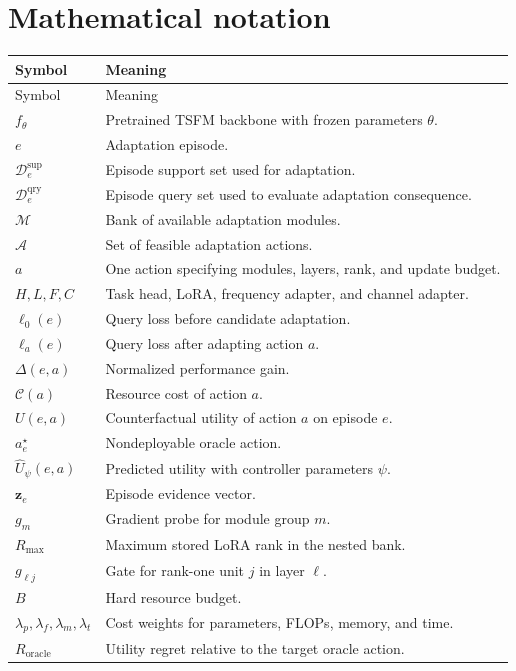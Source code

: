 \documentclass[10pt]{article}
\newcommand{\z}{\mathbf{z}}
\newcommand{\D}{\mathcal{D}}
\newcommand{\Mcal}{\mathcal{M}}
\newcommand{\Acal}{\mathcal{A}}
\newcommand{\Ccal}{\mathcal{C}}
\begin{document}
\section{Mathematical notation}

\begin{longtable}{L{0.16\textwidth}L{0.76\textwidth}}
\toprule
Symbol & Meaning \\
\midrule
\endfirsthead
\toprule
Symbol & Meaning \\
\midrule
\endhead
$f_{\theta}$ & Pretrained TSFM backbone with frozen parameters $\theta$. \\
$e$ & Adaptation episode. \\
$\D_e^{\mathrm{sup}}$ & Episode support set used for adaptation. \\
$\D_e^{\mathrm{qry}}$ & Episode query set used to evaluate adaptation consequence. \\
$\Mcal$ & Bank of available adaptation modules. \\
$\Acal$ & Set of feasible adaptation actions. \\
$a$ & One action specifying modules, layers, rank, and update budget. \\
$H,L,F,C$ & Task head, LoRA, frequency adapter, and channel adapter. \\
$\ell_0(e)$ & Query loss before candidate adaptation. \\
$\ell_a(e)$ & Query loss after adapting action $a$. \\
$\Delta(e,a)$ & Normalized performance gain. \\
$\Ccal(a)$ & Resource cost of action $a$. \\
$U(e,a)$ & Counterfactual utility of action $a$ on episode $e$. \\
$a_e^{\star}$ & Nondeployable oracle action. \\
$\widehat U_{\psi}(e,a)$ & Predicted utility with controller parameters $\psi$. \\
$\z_e$ & Episode evidence vector. \\
$g_m$ & Gradient probe for module group $m$. \\
$R_{\max}$ & Maximum stored LoRA rank in the nested bank. \\
$g_{\ell j}$ & Gate for rank-one unit $j$ in layer $\ell$. \\
$B$ & Hard resource budget. \\
$\lambda_p,\lambda_f,\lambda_m,\lambda_t$ & Cost weights for parameters, FLOPs, memory, and time. \\
$R_{\mathrm{oracle}}$ & Utility regret relative to the target oracle action. \\
\bottomrule
\end{longtable}
\end{document}

